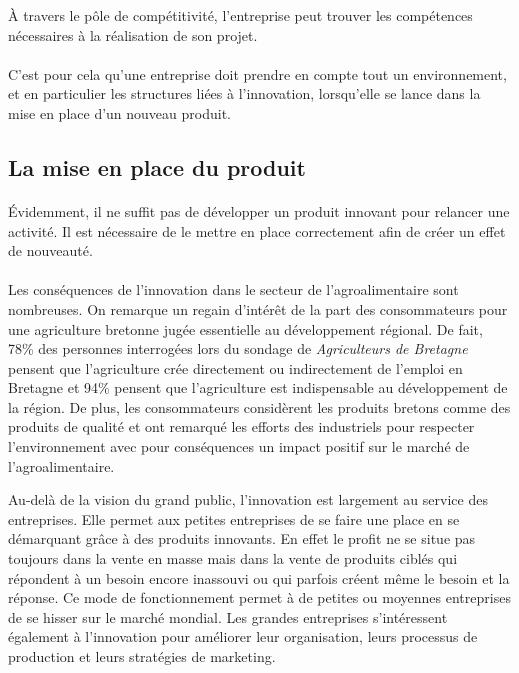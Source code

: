 \documentclass[a4paper,12pt]{report}
\begin{document}
			À travers le pôle de compétitivité, l’entreprise peut trouver les compétences nécessaires à la réalisation de son projet.
			
		\paragraph{}C'est pour cela qu'une entreprise doit prendre en compte tout un environnement, et en particulier les structures liées à l'innovation, lorsqu'elle se lance dans la mise en place d'un nouveau produit.
				
		\subsection{La mise en place du produit}
		\paragraph{}Évidemment, il ne suffit pas de développer un produit innovant pour relancer une activité. Il est nécessaire de le mettre en place correctement afin de créer un effet de nouveauté.
		
		\paragraph{}Les conséquences de l’innovation dans le secteur de l’agroalimentaire sont nombreuses. On remarque un regain d’intérêt de la part des consommateurs pour une agriculture bretonne jugée essentielle au développement régional. De fait, 78\% des personnes interrogées lors du sondage de \textit{Agriculteurs de Bretagne} pensent que l’agriculture crée directement ou indirectement de l’emploi en Bretagne et 94\% pensent que l’agriculture est indispensable au développement de la région\cite{AgriculteursDeBretagne}. De plus, les consommateurs considèrent les produits bretons comme des produits de qualité et ont remarqué les efforts des industriels pour respecter l’environnement avec pour conséquences un impact positif sur le marché de l’agroalimentaire.

    Au-delà de la vision du grand public, l’innovation est largement au service des entreprises. Elle permet aux petites entreprises de se faire une place en se démarquant grâce à des produits innovants. En effet le profit ne se situe pas toujours dans la vente en masse mais dans la vente de produits ciblés qui répondent à un besoin encore inassouvi ou qui parfois créent même le besoin et la réponse. Ce mode de fonctionnement permet à de petites ou moyennes entreprises de se hisser sur le marché mondial.
Les grandes entreprises s’intéressent également à l’innovation pour améliorer leur organisation, leurs processus de production et leurs stratégies de marketing.
\end{document}
